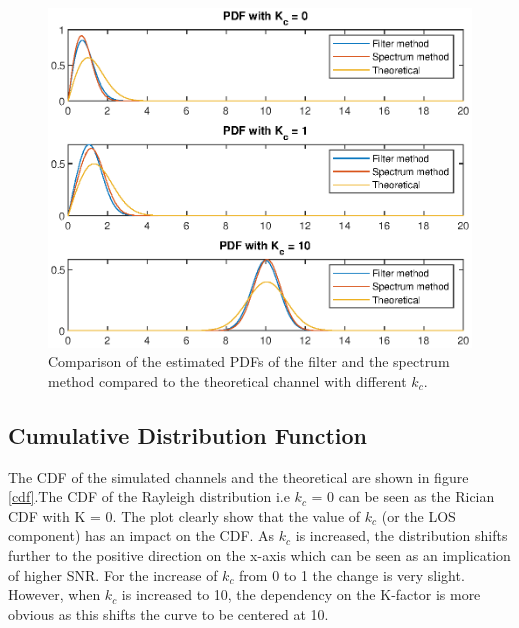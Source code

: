 \documentclass[conference]{IEEEtran}
\begin{document}
    \begin{figure}[H]
        \centering
        \includegraphics[width = \linewidth]{Figures/PDF_test2.eps}
        \caption{Comparison of the estimated PDFs of the filter and the spectrum method compared to the theoretical channel with different $k_{c}$.}
        \label{pdf}
    \end{figure}
    
\subsection{Cumulative Distribution Function}  
    
    The CDF of the simulated channels and the theoretical are shown in figure \ref{cdf}.The CDF of the Rayleigh distribution i.e $k_{c}$ = 0 can be seen as the Rician CDF with K = 0. The plot clearly show that the value of $k_c$ (or the LOS component) has an impact on the CDF. As $k_{c}$ is increased, the distribution shifts further to the positive direction on the x-axis which can be seen as an implication of higher SNR. For the increase of $k_c$ from 0 to 1 the change is very slight. However, when $k_{c}$ is increased to 10, the dependency on the K-factor is more obvious as this shifts the curve to be centered at 10.
    
\end{document}
